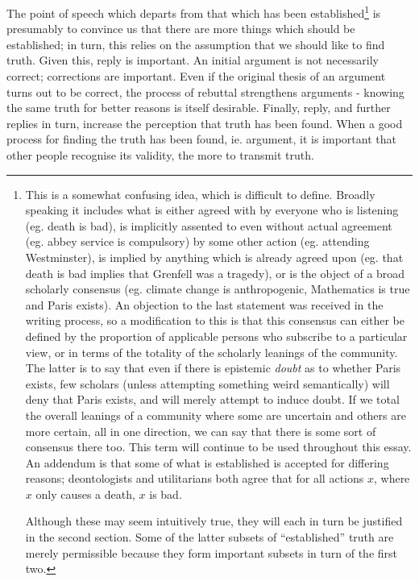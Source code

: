\documentclass[12pt,a4paper]{report}
\begin{document}
\begin{multicols}{2}
The point of speech which departs from that which has been
established\footnote{This is a somewhat confusing idea, which is
	difficult to define. Broadly speaking it includes what is either
	agreed with by everyone who is listening (eg. death is bad), is
	implicitly assented to even without actual agreement (eg. abbey
	service is compulsory) by some other action (eg. attending
	Westminster), is implied by anything which is already agreed upon (eg.
	that death is bad implies that Grenfell was a tragedy), or is the
	object of a broad scholarly consensus (eg. climate change is
	anthropogenic, Mathematics is true and Paris exists). An objection to
	the last statement was received in the writing process, so a
	modification to this is that this consensus can either be defined by
	the proportion of applicable persons who subscribe to a particular
	view, or in terms of the totality of the scholarly leanings of the
	community. The latter is to say that even if there is epistemic
	\textit{doubt} as to whether Paris exists, few scholars (unless
	attempting something weird semantically) will deny that Paris exists,
	and will merely attempt to induce doubt. If we total the overall
	leanings of a community where some are uncertain and others are more
	certain, all in one direction, we can say that there is some sort of
	consensus there too. This term will continue to be used throughout
	this essay. An addendum is that some of what is established is
	accepted for differing reasons; deontologists and utilitarians both
	agree that for all actions $x$, where $x$ only causes a
	death, $x$ is bad.
	
	Although these may seem intuitively true, they will each in turn be
	justified in the second section. Some of the latter subsets of
	``established'' truth are merely permissible because they form
	important subsets in turn of the first two.} is presumably to convince
us that there are more things which should be established; in turn, this
relies on the assumption that we should like to find truth. Given this,
reply is important. An initial argument is not necessarily correct;
corrections are important. Even if the original thesis of an argument
turns out to be correct, the process of rebuttal strengthens arguments -
knowing the same truth for better reasons is itself desirable. Finally,
reply, and further replies in turn, increase the perception that truth
has been found. When a good process for finding the truth has been
found, ie. argument, it is important that other people recognise its
validity, the more to transmit truth.


\end{multicols}
\end{document}
